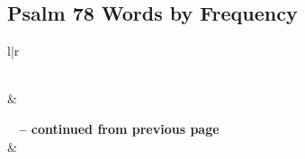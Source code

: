 

\subsection{Psalm 78 Words by Frequency}


\normalsize
 
\begin{center}
\begin{longtable}{l|r}
\caption[Psalm 78 Words by Frequency]{Psalm 78 Words by Frequency}\label{table:WordsbyFrequency for Psalm 78} \\
\hline {} &  \\ \hline 
\endfirsthead
 
{{\bfseries \tablename\ \thetable{} -- continued from previous page}} \\  
\hline {} &  \\ \hline 
\endhead
 

\end{longtable}
\end{center}
